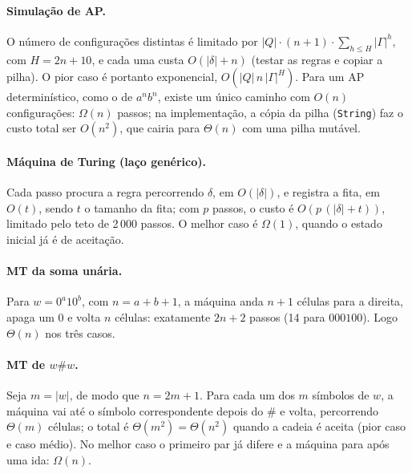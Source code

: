 \documentclass[12pt,a4paper]{article}
\newcommand{\cod}[1]{\texttt{#1}}
\begin{document}
\paragraph{Simulação de AP.} O número de configurações distintas é limitado por
$|Q| \cdot (n+1) \cdot \sum_{h \le H} |\Gamma|^h$, com $H = 2n + 10$, e cada uma
custa $O(|\delta| + n)$ (testar as regras e copiar a pilha). O pior caso é
portanto exponencial, $O(|Q|\,n\,|\Gamma|^{H})$. Para um AP determinístico,
como o de $a^nb^n$, existe um único caminho com $O(n)$ configurações:
$\Omega(n)$ passos; na implementação, a cópia da pilha (\cod{String}) faz o
custo total ser $O(n^2)$, que cairia para $\Theta(n)$ com uma pilha mutável.

\paragraph{Máquina de Turing (laço genérico).} Cada passo procura a regra
percorrendo $\delta$, em $O(|\delta|)$, e registra a fita, em $O(t)$, sendo $t$ o
tamanho da fita; com $p$ passos, o custo é $O(p\,(|\delta| + t))$, limitado pelo
teto de 2\,000 passos. O melhor caso é $\Omega(1)$, quando o estado inicial
já é de aceitação.

\paragraph{MT da soma unária.} Para $w = 0^a10^b$, com $n = a + b + 1$, a máquina
anda $n+1$ células para a direita, apaga um $0$ e volta $n$ células: exatamente
$2n + 2$ passos (14 para $000100$). Logo $\Theta(n)$ nos três casos.

\paragraph{MT de $w\#w$.} Seja $m = |w|$, de modo que $n = 2m + 1$. Para cada um
dos $m$ símbolos de $w$, a máquina vai até o símbolo correspondente depois do
$\#$ e volta, percorrendo $\Theta(m)$ células; o total é $\Theta(m^2) =
\Theta(n^2)$ quando a cadeia é aceita (pior caso e caso médio). No melhor caso
o primeiro par já difere e a máquina para após uma ida: $\Omega(n)$.
\end{document}
